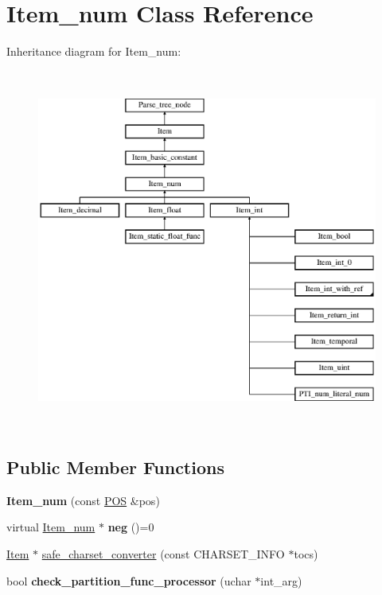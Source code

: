 \hypertarget{classItem__num}{}\section{Item\+\_\+num Class Reference}
\label{classItem__num}
Inheritance diagram for Item\+\_\+num\+:\begin{figure}[H]
\begin{center}
\leavevmode
\includegraphics[height=11.914893cm]{classItem__num}
\end{center}
\end{figure}
\subsection*{Public Member Functions}
\begin{DoxyCompactItemize}
\item 
\mbox{\label{classItem__num_afbd7272c8b02a3927fb954a1381f891f}} 
{\bfseries Item\+\_\+num} (const \mbox{\hyperlink{structYYLTYPE}{P\+OS}} \&pos)
\item 
\mbox{\label{classItem__num_aa6fd1be00b536f1b21a54f34c0a2e973}} 
virtual \mbox{\hyperlink{classItem__num}{Item\+\_\+num}} $\ast$ {\bfseries neg} ()=0
\item 
\mbox{\hyperlink{classItem}{Item}} $\ast$ \mbox{\hyperlink{classItem__num_a2185b5b16fe2ec007c127b1c3567b233}{safe\+\_\+charset\+\_\+converter}} (const C\+H\+A\+R\+S\+E\+T\+\_\+\+I\+N\+FO $\ast$tocs)
\item 
\mbox{\label{classItem__num_aa6e7bab16fdfa112ff1a2a3a1c200de4}} 
bool {\bfseries check\+\_\+partition\+\_\+func\+\_\+processor} (uchar $\ast$int\+\_\+arg)
\end{DoxyCompactItemize}
